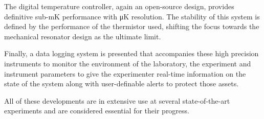 The digital temperature controller, again an open-source design, provides definitive sub-\unit{\milli\kelvin} performance with \unit{\micro\kelvin} resolution. The stability of this system is defined by the performance of the thermistor used, shifting the focus towards the mechanical resonator design as the ultimate limit.

Finally, a data logging system is presented that accompanies these high precision instruments to monitor the environment of the laboratory, the experiment and instrument parameters to give the experimenter real-time information on the state of the system along with user-definable alerts to protect those assets.

All of these developments are in extensive use at several state-of-the-art experiments and are considered essential for their progress.
